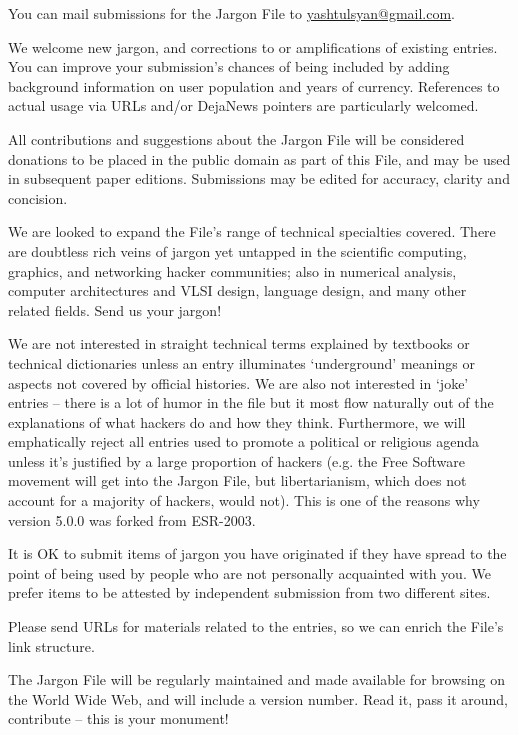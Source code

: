 You can mail submissions for the Jargon File to \url{yashtulsyan@gmail.com}.

We welcome new jargon, and corrections to or amplifications of existing
entries. You can improve your submission's chances of being included by adding
background information on user population and years of currency. References to
actual usage via URLs and/or DejaNews pointers are particularly welcomed.

All contributions and suggestions about the Jargon File will be considered
donations to be placed in the public domain as part of this File, and may be
used in subsequent paper editions. Submissions may be edited for accuracy,
clarity and concision.

We are looked to expand the File's range of technical specialties covered.
There are doubtless rich veins of jargon yet untapped in the scientific
computing, graphics, and networking hacker communities; also in numerical
analysis, computer architectures and VLSI design, language design, and many
other related fields. Send us your jargon!

We are not interested in straight technical terms explained by textbooks or
technical dictionaries unless an entry illuminates `underground' meanings or
aspects not covered by official histories. We are also not interested in `joke'
entries -- there is a lot of humor in the file but it most flow naturally out
of the explanations of what hackers do and how they think. Furthermore, we will
emphatically reject all entries used to promote a political or religious agenda
unless it's justified by a large proportion of hackers (e.g. the Free Software
movement will get into the Jargon File, but libertarianism, which does not
account for a majority of hackers, would not). This is one of the reasons why
version 5.0.0 was forked from ESR-2003.

It is OK to submit items of jargon you have originated if they have spread to
the point of being used by people who are not personally acquainted with you.
We prefer items to be attested by independent submission from two different
sites.

Please send URLs for materials related to the entries, so we can enrich the
File's link structure.

The Jargon File will be regularly maintained and made available for browsing on
the World Wide Web, and will include a version number. Read it, pass it around,
contribute -- this is your monument!

